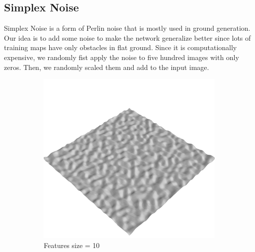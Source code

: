 \documentclass[../document.tex]{subfiles}
\begin{document}
\subsection{Simplex Noise} 
Simplex Noise is a form of Perlin noise that is mostly used in ground generation. Our idea is to add some noise to make the network generalize better since lots of training maps have only obstacles in flat ground. Since it is computationally expensive, we randomly fist apply the noise to five hundred images with only zeros. Then, we randomly scaled them and add to the input image. 
\begin{figure}[H]
    \centering

        \begin{subfigure}[b]{0.32\textwidth}
            \includegraphics[width=\textwidth]{../img/data-aug/3d/simplex1.png}
            \caption{Features size = 10}
        \end{subfigure}
        \begin{subfigure}[b]{0.32\linewidth}

\end{subfigure}
\end{figure}
\end{document}
